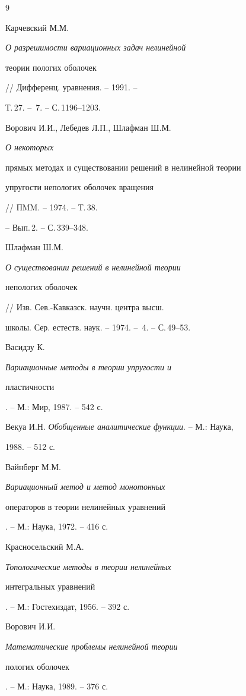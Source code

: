 \begin{thebibliography}{9} 


 




Карчевский М.М. {\em О разрешимости вариационных задач нелинейной 


теории пологих оболочек} // Дифференц. уравнения. -- 1991. -- 


Т.\,27. -- \No\,7. -- С.\,1196--1203. 




Ворович И.И., Лебедев Л.П., Шлафман Ш.М. {\em О некоторых 


прямых методах и существовании решений в нелинейной теории 


упругости непологих оболочек вращения} // ПMM. -- 1974. -- Т.\,38. 


-- Вып.\,2. -- С.\,339--348. 




Шлафман Ш.М. {\em О существовании решений в нелинейной теории 


непологих оболочек} // Изв. Сев.-Кавказск. научн. центра высш. 


школы. Сер. естеств. наук. -- 1974. -- \No\,4. -- С.\,49--53. 




Васидзу К. {\em Вариационные методы в теории упругости и 


пластичности}. -- М.: Мир, 1987. -- 542 с. 








Векуа И.Н. {\em Обобщенные аналитические функции}. -- М.: Наука, 


1988. -- 512 с. 




Вайнберг М.М. {\em Вариационный метод и метод монотонных 


операторов в теории нелинейных уравнений}. -- М.: Наука, 1972. -- 416 с. 




Красносельский М.А. {\em Топологические методы в теории нелинейных 


интегральных уравнений}. -- М.: Гостехиздат, 1956. -- 392 с. 




Ворович И.И. {\em Математические проблемы нелинейной теории 


пологих оболочек}. -- М.: Наука, 1989. -- 376 с. 


 


\end{thebibliography} 


 


\vskip 2cm 


 






 


\label{end} 


 





